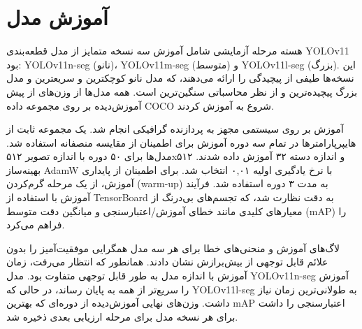 \documentclass[oneside]{report}
\begin{document}
\chapter{آموزش مدل}
هسته مرحله آزمایشی شامل آموزش سه نسخه متمایز از مدل قطعه‌بندی YOLOv11 بود: YOLOv11n-seg (نانو)، YOLOv11m-seg (متوسط) و YOLOv11l-seg (بزرگ). این نسخه‌ها طیفی از پیچیدگی را ارائه می‌دهند، که مدل نانو کوچکترین و سریعترین و مدل بزرگ پیچیده‌ترین و از نظر محاسباتی سنگین‌ترین است. همه مدل‌ها از وزن‌های از پیش آموزش‌دیده بر روی مجموعه داده COCO شروع به آموزش کردند.

آموزش بر روی سیستمی مجهز به پردازنده گرافیکی  انجام شد. یک مجموعه ثابت از هایپرپارامترها در تمام سه دوره آموزش برای اطمینان از مقایسه منصفانه استفاده شد. مدل‌ها برای ۵۰ دوره با اندازه تصویر ۵۱۲x۵۱۲ و اندازه دسته ۳۲ آموزش داده شدند. بهینه‌ساز AdamW با نرخ یادگیری اولیه ۰,۰۱ انتخاب شد. برای اطمینان از پایداری آموزش، از یک مرحله گرم‌کردن (warm-up) به مدت ۳ دوره استفاده شد. فرآیند آموزش با استفاده از TensorBoard به دقت نظارت شد، که تجسم‌های بی‌درنگ از معیارهای کلیدی مانند خطای آموزش/اعتبارسنجی و میانگین دقت متوسط (mAP) را فراهم می‌کرد.

لاگ‌های آموزش و منحنی‌های خطا برای هر سه مدل همگرایی موفقیت‌آمیز را بدون علائم قابل توجهی از بیش‌برازش نشان دادند. همانطور که انتظار می‌رفت، زمان آموزش با اندازه مدل به طور قابل توجهی متفاوت بود. مدل YOLOv11n-seg آموزش را سریع‌تر از همه به پایان رساند، در حالی که YOLOv11l-seg به طولانی‌ترین زمان نیاز داشت. وزن‌های نهایی آموزش‌دیده از دوره‌ای که بهترین mAP اعتبارسنجی را داشت برای هر نسخه مدل برای مرحله ارزیابی بعدی ذخیره شد.
\end{document}
